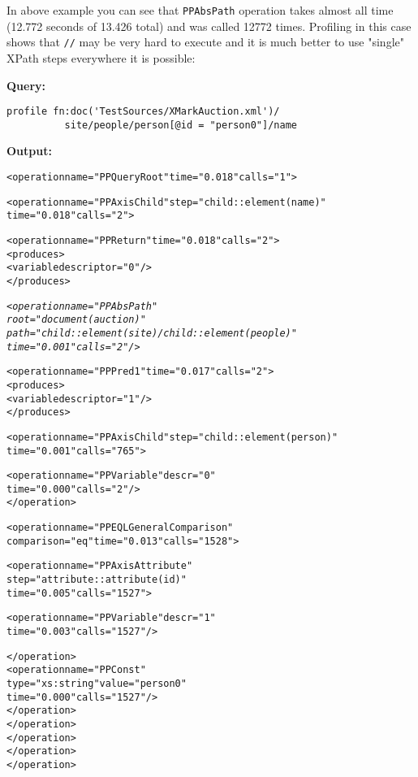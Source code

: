 \documentclass[a4paper,12pt]{article}
\begin{document}
In above example you can see that \verb!PPAbsPath! operation takes almost all
time (12.772 seconds of 13.426 total) and was called 12772 times. Profiling in
this case shows that \verb!//! may be very hard to execute and it is much better
to use "single" XPath steps everywhere it is possible:

\medskip
\noindent
\textbf{Query:}
\begin{verbatim}
profile fn:doc('TestSources/XMarkAuction.xml')/
          site/people/person[@id = "person0"]/name
\end{verbatim}

\medskip
\noindent
\textbf{Output:}

\small{
\begin{alltt}
<operation name="PPQueryRoot" time="0.018" calls="1">

  <operation name="PPAxisChild" step="child::element(name)"
                                time="0.018" calls="2">

    <operation name="PPReturn" time="0.018" calls="2">
      <produces>
        <variable descriptor="0"/>
      </produces>

      \emph{<operation name="PPAbsPath"
                 root="document(auction)"
                 path="child::element(site)/child::element(people)"
                 time="0.001" calls="2"/>}

      <operation name="PPPred1" time="0.017" calls="2">
        <produces>
          <variable descriptor="1"/>
        </produces>

        <operation name="PPAxisChild" step="child::element(person)"
                                      time="0.001" calls="765">

          <operation name="PPVariable" descr="0"
                     time="0.000" calls="2"/>
        </operation>

        <operation name="PPEQLGeneralComparison"
                   comparison="eq" time="0.013" calls="1528">

          <operation name="PPAxisAttribute"
                     step="attribute::attribute(id)"
                     time="0.005" calls="1527">

            <operation name="PPVariable" descr="1"
                       time="0.003" calls="1527"/>

          </operation>
          <operation name="PPConst"
                     type="xs:string" value="person0"
                     time="0.000" calls="1527"/>
        </operation>
      </operation>
    </operation>
  </operation>
</operation>
\end{alltt}}
\end{document}
